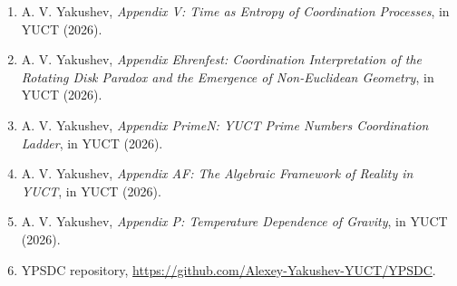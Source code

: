 \documentclass[12pt,a4paper]{article}
\begin{document}
\begin{enumerate}
		\item A. V. Yakushev, \emph{Appendix V: Time as Entropy of Coordination Processes}, in YUCT (2026).
		\item A. V. Yakushev, \emph{Appendix Ehrenfest: Coordination Interpretation of the Rotating Disk Paradox and the Emergence of Non-Euclidean Geometry}, in YUCT (2026).
		\item A. V. Yakushev, \emph{Appendix PrimeN: YUCT Prime Numbers Coordination Ladder}, in YUCT (2026).
		\item A. V. Yakushev, \emph{Appendix AF: The Algebraic Framework of Reality in YUCT}, in YUCT (2026).
		\item A. V. Yakushev, \emph{Appendix P: Temperature Dependence of Gravity}, in YUCT (2026).
		\item YPSDC repository, \url{https://github.com/Alexey-Yakushev-YUCT/YPSDC}.
	\end{enumerate}
	
\end{document}
